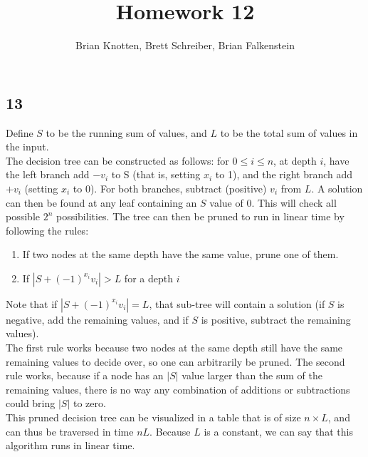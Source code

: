 \documentclass[letterpaper,notitlepage,twoside]{article}
\begin{document}
\title{Homework 12}
\author{Brian Knotten, Brett Schreiber, Brian Falkenstein}
\maketitle

\subsection*{13}
Define $S$ to be the running sum of values, and $L$ to be the total sum of values in the input.\\
The decision tree can be constructed as follows: for $0\leq i \leq n$, at depth $i$, have the left branch add $-v_i$ to S (that is, setting $x_i$ to 1), and the right branch add $+v_i$ (setting $x_i$ to 0). For both branches, subtract (positive) $v_i$ from $L$. A solution can then be found at any leaf containing an $S$ value of 0. This will check all possible $2^n$ possibilities. The tree can then be pruned to run in linear time by following the rules: 
\begin{enumerate}
\item If two nodes at the same depth have the same value, prune one of them. 
\item If $|S+(-1)^{x_i} v_i| > L$ for a depth $i$ 
\end{enumerate}
Note that if $|S+(-1)^{x_i} v_i| = L$, that sub-tree will contain a solution (if $S$ is negative, add the remaining values, and if $S$ is positive, subtract the remaining values). \\
The first rule works because two nodes at the same depth still have the same remaining values to decide over, so one can arbitrarily be pruned. The second rule works, because if a node has an $|S|$ value larger than the sum of the remaining values, there is no way any combination of additions or subtractions could bring $|S|$ to zero. \\
This pruned decision tree can be visualized in a table that is of size $n\times L$, and can thus be traversed in time $nL$. Because $L$ is a constant, we can say that this algorithm runs in linear time. 
\end{document}
